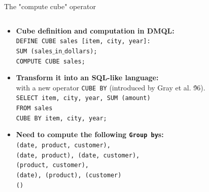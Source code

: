 \documentclass[aspectratio=169,t]{beamer}
\begin{document}
  { 
    \begin{frame}{The "compute cube" operator}
      \begin{columns}
        \begin{column}{0.6\textwidth}
          \vspace{-5.1cm}
          \begin{itemize}
            \item \textbf{Cube definition and computation in DMQL:} \\
                  \texttt{DEFINE CUBE sales [item, city, year]:}\\
                  \texttt{SUM (sales$\_$in$\_$dollars);}\\
                  \texttt{COMPUTE CUBE sales;}
            \item \textbf{Transform it into an SQL-like language:}\\
            with a new operator \texttt{CUBE BY} (introduced by Gray et al. \'96).\\
            \texttt{SELECT item, city, year, SUM (amount)}\\
            \texttt{FROM sales}\\
            \texttt{CUBE BY item, city, year;}
            \item \textbf{Need to compute the following \texttt{Group by}s:}\\
            \texttt{(date, product, customer),}\\
            \texttt{(date, product), (date, customer),}\\
            \texttt{(product, customer),}\\
            \texttt{(date), (product), (customer)}\\
            \texttt{()}
          \end{itemize}
        \end{column}
        \begin{column}{0.3\textwidth}  %
        \end{column}
      \end{columns}
    \end{frame}
  }
\end{document}
